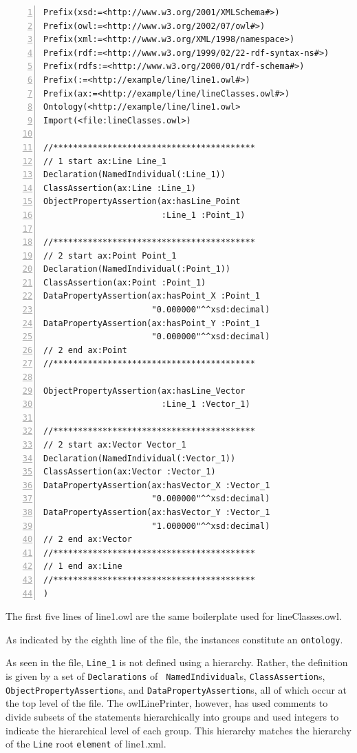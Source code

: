 \documentclass[preprint,12pt]{elsarticle}
\newenvironment{mylisting}
{\begin{list}{}{\setlength{\leftmargin}{1em}}\item\small}
{\end{list}}
\begin{document}
\begin{mylisting}
\begin{Verbatim}[commandchars=\\\{\},numbers=left, numbersep=1pt]
Prefix(xsd:=<http://www.w3.org/2001/XMLSchema#>)
Prefix(owl:=<http://www.w3.org/2002/07/owl#>)
Prefix(xml:=<http://www.w3.org/XML/1998/namespace>)
Prefix(rdf:=<http://www.w3.org/1999/02/22-rdf-syntax-ns#>)
Prefix(rdfs:=<http://www.w3.org/2000/01/rdf-schema#>)
Prefix(:=<http://example/line/line1.owl#>)
Prefix(ax:=<http://example/line/lineClasses.owl#>)
Ontology(<http://example/line/line1.owl>
Import(<file:lineClasses.owl>)

//*****************************************
// 1 start ax:Line Line_1
Declaration(NamedIndividual(:Line_1))
ClassAssertion(ax:Line :Line_1)
ObjectPropertyAssertion(ax:hasLine_Point
                        :Line_1 :Point_1)

//*****************************************
// 2 start ax:Point Point_1
Declaration(NamedIndividual(:Point_1))
ClassAssertion(ax:Point :Point_1)
DataPropertyAssertion(ax:hasPoint_X :Point_1
                      "0.000000"^^xsd:decimal)
DataPropertyAssertion(ax:hasPoint_Y :Point_1
                      "0.000000"^^xsd:decimal)
// 2 end ax:Point
//*****************************************

ObjectPropertyAssertion(ax:hasLine_Vector
                        :Line_1 :Vector_1)

//*****************************************
// 2 start ax:Vector Vector_1
Declaration(NamedIndividual(:Vector_1))
ClassAssertion(ax:Vector :Vector_1)
DataPropertyAssertion(ax:hasVector_X :Vector_1
                      "0.000000"^^xsd:decimal)
DataPropertyAssertion(ax:hasVector_Y :Vector_1
                      "1.000000"^^xsd:decimal)
// 2 end ax:Vector
//*****************************************
// 1 end ax:Line
//*****************************************
)
\end{Verbatim}
\label{owlInstance}
\end{mylisting}


The first five lines of line1.owl are the same boilerplate used for
lineClasses.owl.

As indicated by the eighth line of the file, the instances constitute an
{\tt ontology}.

As seen in the file, {\tt Line\_1} is not defined using a hierarchy.
Rather, the definition is given by a set of {\tt Declarations} of {\tt
  NamedIndividual}s, {\tt ClassAssertion}s, {\tt ObjectPropertyAssertion}s,
and {\tt DataPropertyAssertion}s, all of which occur at the top level of
the file. The owlLinePrinter, however, has used comments to divide subsets
of the statements hierarchically into groups and used integers to indicate
the hierarchical level of each group. This hierarchy matches the hierarchy
of the {\tt Line} root {\tt element} of line1.xml.
\end{document}
